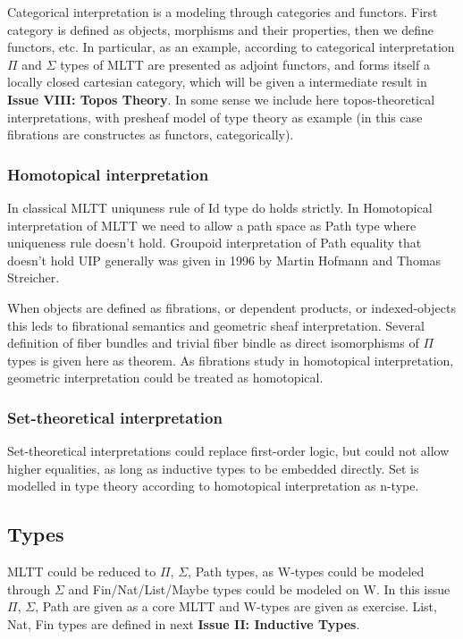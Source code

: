 \documentclass[twocolumn,10pt]{article}
\theoremstyle{definition}
\begin{document}
Categorical interpretation\cite{Curien14} is a modeling through categories and functors.
First category is defined as objects, morphisms and their properties, then
we define functors, etc. In particular, as an example, according to categorical
interpretation $\Pi$ and $\Sigma$ types of MLTT are presented as adjoint
functors, and forms itself a locally closed cartesian category, which will be given a
intermediate result in {\bf Issue VIII: Topos Theory}. In some sense we include here
topos-theoretical interpretations, with presheaf model of type theory as
example (in this case fibrations are constructes as functors, categorically).

\subsubsection{Homotopical interpretation}

In classical MLTT uniquness rule of Id type do holds strictly. In Homotopical
interpretation of MLTT we need to allow a path space as Path type where uniqueness
rule doesn't hold. Groupoid interpretation of Path equality that doesn't hold UIP generally
was given in 1996 by Martin Hofmann and Thomas Streicher\cite{Hofmann96}.

When objects are defined as fibrations, or dependent products, or indexed-objects
this leds to fibrational semantics and geometric sheaf interpretation. Several definition
of fiber bundles and trivial fiber bindle as direct isomorphisms of $\Pi$ types is
given here as theorem. As fibrations study in homotopical interpretation, geometric
interpretation could be treated as homotopical.

\subsubsection{Set-theoretical interpretation}

Set-theoretical interpretations could replace first-order logic, but could not allow
higher equalities, as long as inductive types to be embedded directly. Set is modelled
in type theory according to homotopical interpretation as n-type.

\subsection{Types}

MLTT could be reduced to $\Pi$, $\Sigma$, Path types, as W-types could be
modeled through $\Sigma$ and Fin/Nat/List/Maybe types could be modeled on W.
In this issue $\Pi$, $\Sigma$, Path are given as a core MLTT and W-types
are given as exercise. List, Nat, Fin types are defined in next {\bf Issue II: Inductive Types}.
\end{document}
